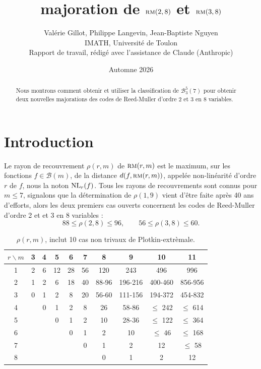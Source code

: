 \documentclass[11pt,a4paper]{article}
\title{majoration de  $\rmc(2,8)$ et $\rmc(3,8)$}
\author{Valérie Gillot, Philippe Langevin, Jean-Baptiste Nguyen\\
{\small IMATH, Université de Toulon}\\[4pt]
{\small Rapport de travail, rédigé avec l'assistance de Claude (Anthropic)}}
\date{Automne 2026}
\newcommand{\dist}{d}
\def\bst(#1,#2,#3){\mathcal{B}_{#1}^{#2}(#3)}
\def\NL(#1,#2){ {\rm NL}_{#1}(#2) }
\def\rmc(#1,#2){ \textsc {rm}(#1,#2) }
\def\boole(#1){\mathcal{B}(#1)}
\theoremstyle{plain}
\theoremstyle{definition}
\theoremstyle{remark}
\begin{document}
\maketitle

\begin{abstract}
Nous montrons comment obtenir et utiliser la classification de 
$\bst(3,5,7)$ pour obtenir deux nouvelles majorations des codes
de Reed-Muller d'ordre 2 et 3 en 8 variables.
\end{abstract}

\section{Introduction}


Le rayon de recouvrement $\rho(r, m)$ de $\rmc(r,m)$ est le maximum, sur les fonctions
$f\in\boole(m)$, de la distance $\dist(f,\rmc(r,m))$, appelée non-linéarité d'ordre $r$ de $f$,
nous la noton $\NL(r,f)$. Tous les rayons de recouvrements sont connus pour $m\leq 7$,
signalons que  la détermination de $\rho(1,9)$ vient d'être faite après 40 ans d'efforts,
alors les deux premiers cas ouverts concernent les codes de Reed-Muller d'ordre 2 et
et 3 en 8 variables :
$$
	88 \leq \rho(2,8) \leq 96, \qquad  56\leq \rho(3,8) \leq 60.
$$


\begin{table}
        \center
        \caption{$\rho(r,m)$, inclut 10 cas non trivaux de Plotkin-extrèmale.}
        \label{tab:tab_rho}
        \begin{tabular}{c|ccccccccc}
                $r\backslash m$ & 3 & 4 & 5 & 6 & 7 & 8 & 9 & 10 & 11 \\
                \hline
                1 & 2 & \cellcolor{plotkin}6 & 12 & \cellcolor{plotkin}28 & 56 & \cellcolor{plotkin}120 & 243 & 496 & 996 \\
                2 & \cellcolor{trivial}1 & 2 & 6 & \cellcolor{plotkin}18 & 40 & 88-96 & 196-216 & 400-460 & 856-956 \\
                3 & 0 & \cellcolor{trivial}1 & 2 & \cellcolor{plotkin}8 & 20 & 56-60 & 111-156 & 194-372 & 454-832 \\
                4 &  & 0 & \cellcolor{trivial}1 & 2 & 8 & 26 & 58-86 & $\leq$ 242 & $\leq$ 614 \\
                5 &  &  & 0 & \cellcolor{trivial}1 & 2 & \cellcolor{plotkin}10 & 28-36 & $\leq$ 122 & $\leq$ 364 \\
                6 &  &  &  & 0 & \cellcolor{trivial}1 & 2 & 10 & $\leq$ 46 & $\leq$ 168 \\
                7 &  &  &  &  & 0 & \cellcolor{trivial}1 & 2 & \cellcolor{plotkin}12 & $\leq$ 58 \\
                8 &  &  &  &  &  & 0 & \cellcolor{trivial}1 & 2 & 12 \\
                \hline
        \end{tabular}
\end{table}
\end{document}

